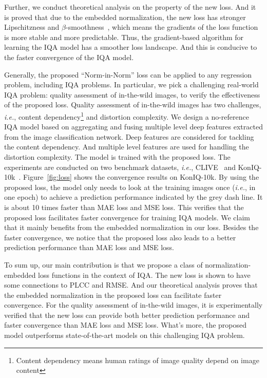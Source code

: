 \documentclass[sigconf]{acmart}
\begin{document}
Further, we conduct theoretical analysis on the property of the new loss. 
And it is proved that due to the embedded normalization, the new loss has stronger Lipschitzness and $\beta$-smoothness~\cite{nesterov2013introductory}, which means the gradients of the loss function is more stable and more predictable. 
Thus, the gradient-based algorithm for learning the IQA model has a smoother loss landscape.
And this is conducive to the faster convergence of the IQA model.

Generally, the proposed ``Norm-in-Norm'' loss can be applied to any regression problem, including IQA problems.
In particular, we pick a challenging real-world IQA problem: quality assessment of in-the-wild images, to verify the effectiveness of the proposed loss.
Quality assessment of in-the-wild images has two challenges, \textit{i.e.}, content dependency\footnote{Content dependency means human ratings of image quality depend on image content} and distortion complexity.
We design a no-reference IQA model based on aggregating and fusing multiple level deep features extracted from the image classification network.
Deep features are considered for tackling the content dependency. 
And multiple level features are used for handling the distortion complexity.
The model is trained with the proposed loss. 
The experiments are conducted on two benchmark datasets, \textit{i.e.}, CLIVE~\cite{ghadiyaram2016massive} and KonIQ-10k~\cite{hosu2019koniq}.
Figure~\ref{fig:loss} shows the convergence results on KonIQ-10k.
By using the proposed loss, the model only needs to look at the training images once (\textit{i.e.}, in one epoch) to achieve a prediction performance indicated by the grey dash line.
It is about 10 times faster than MAE loss and MSE loss.
This verifies that the proposed loss facilitates faster convergence for training IQA models.
We claim that it mainly benefits from the embedded normalization in our loss.
Besides the faster convergence, we notice that the proposed loss also leads to a better prediction performance than MAE loss and MSE loss.

To sum up, our main contribution is that we propose a class of normalization-embedded loss functions in the context of IQA.
The new loss is shown to have some connections to PLCC and RMSE.
And our theoretical analysis proves that the embedded normalization in the proposed loss can facilitate faster convergence.
For the quality assessment of in-the-wild images, it is experimentally verified that the new loss can provide both better prediction performance and faster convergence than MAE loss and MSE loss. 
What's more, the proposed model outperforms state-of-the-art models on this challenging IQA problem.
\end{document}
